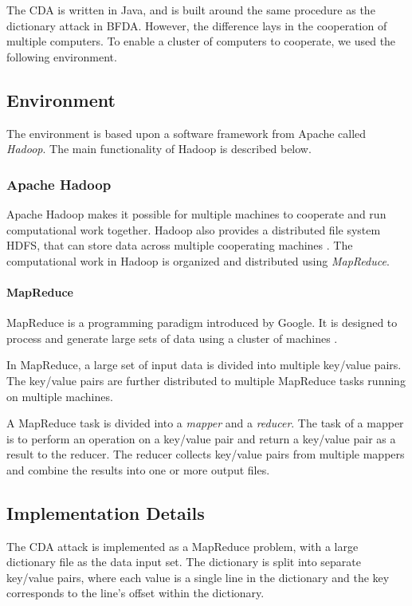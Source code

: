 \documentclass[pdftex,english,10pt,b5paper,twoside]{book}
\begin{document}
The \ac{CDA} is written in Java, and is built around the same procedure as the
dictionary attack in \ac{BFDA}. However, the difference lays in the cooperation
of multiple computers. To enable a cluster of computers to cooperate, we used
the following environment.

\subsection{Environment}

The environment is based upon a software framework from Apache called
\emph{Hadoop}. The main functionality of Hadoop is described below.

\subsubsection{Apache Hadoop}

Apache Hadoop makes it possible for multiple machines to cooperate
and run computational work together. Hadoop also provides a distributed file system
\ac{HDFS}, that can store data across multiple cooperating machines \cite{hadoop}. The
computational work in Hadoop is organized and distributed using \emph{MapReduce}.

\paragraph{MapReduce} MapReduce is a programming paradigm introduced by Google.
It is designed to process and generate large sets of data using a cluster of
machines \cite{mapred}.

In MapReduce, a large set of input data is divided into multiple key/value
pairs. The key/value pairs are further distributed to multiple MapReduce tasks
running on multiple machines.

A MapReduce task is divided into a \emph{mapper} and a \emph{reducer}. The task
of a mapper is to perform an operation on a key/value pair and return a
key/value pair as a result to the reducer. The reducer collects key/value pairs
from multiple mappers and combine the results into one or more output files.

\subsection{Implementation Details}

The \ac{CDA} attack is implemented as a MapReduce problem, with a large
dictionary file as the data input set. The dictionary is split into separate
key/value pairs, where each value is a single line in the dictionary and the
key corresponds to the line's offset within the dictionary.
\end{document}
